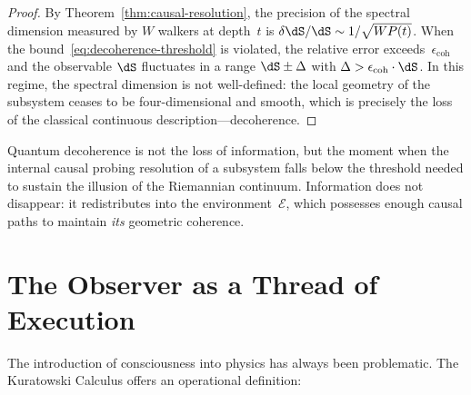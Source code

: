 \begin{proof}
By Theorem~\ref{thm:causal-resolution}, the precision of the spectral
dimension measured by $W$ walkers at depth~$t$ is
$\delta\dS / \dS \sim 1/\sqrt{W P(t)}$. When the
bound~\eqref{eq:decoherence-threshold} is violated, the relative error
exceeds~$\epsilon_{\text{coh}}$ and the observable $\dS$ fluctuates in a
range $\dS \pm \Delta$ with $\Delta > \epsilon_{\text{coh}} \cdot
\dS$. In this regime, the spectral dimension is not well-defined: the
local geometry of the subsystem ceases to be four-dimensional and smooth,
which is precisely the loss of the classical continuous
description---decoherence.
\end{proof}


\begin{result}[title={Decoherence as a Topological Phenomenon}]
\label{res:decoherence}
Quantum decoherence is not the loss of information, but the moment when
the internal causal probing resolution of a subsystem falls below the
threshold needed to sustain the illusion of the Riemannian continuum.
Information does not disappear: it redistributes into the
environment~$\mathcal{E}$, which possesses enough causal paths to
maintain \emph{its} geometric coherence.
\end{result}

\section*{The Observer as a Thread of Execution}

The introduction of consciousness into physics has always been
problematic. The Kuratowski Calculus offers an operational definition:

